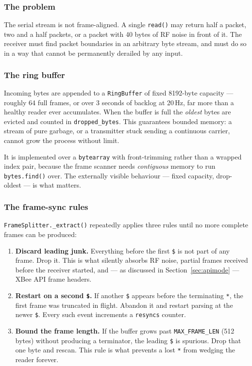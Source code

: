 \documentclass[11pt,a4paper]{article}
\newcommand{\code}[1]{\texttt{#1}}
\begin{document}
\subsubsection{The problem}

The serial stream is not frame-aligned. A single \code{read()} may return
half a packet, two and a half packets, or a packet with 40 bytes of RF noise
in front of it. The receiver must find packet boundaries in an arbitrary byte
stream, and must do so in a way that cannot be permanently derailed by any
input.

\subsubsection{The ring buffer}

Incoming bytes are appended to a \code{RingBuffer} of fixed 8192-byte
capacity --- roughly 64 full frames, or over 3 seconds of backlog at 20\,Hz,
far more than a healthy reader ever accumulates. When the buffer is full the
\emph{oldest} bytes are evicted and counted in \code{dropped\_bytes}. This
guarantees bounded memory: a stream of pure garbage, or a transmitter stuck
sending a continuous carrier, cannot grow the process without limit.

It is implemented over a \code{bytearray} with front-trimming rather than a
wrapped index pair, because the frame scanner needs \emph{contiguous} memory
to run \code{bytes.find()} over. The externally visible behaviour ---
fixed capacity, drop-oldest --- is what matters.

\subsubsection{The frame-sync rules}

\code{FrameSplitter.\_extract()} repeatedly applies three rules until no more
complete frames can be produced:

\begin{enumerate}
  \item \textbf{Discard leading junk.} Everything before the first \code{\$}
        is not part of any frame. Drop it. This is what silently absorbs RF
        noise, partial frames received before the receiver started, and ---
        as discussed in Section~\ref{sec:apimode} --- XBee API frame headers.
  \item \textbf{Restart on a second \code{\$}.} If another \code{\$} appears
        before the terminating \code{*}, the first frame was truncated in
        flight. Abandon it and restart parsing at the newer \code{\$}. Every
        such event increments a \code{resyncs} counter.
  \item \textbf{Bound the frame length.} If the buffer grows past
        \code{MAX\_FRAME\_LEN} (512 bytes) without producing a terminator,
        the leading \code{\$} is spurious. Drop that one byte and rescan.
        This rule is what prevents a lost \code{*} from wedging the reader
        forever.
\end{enumerate}
\end{document}
